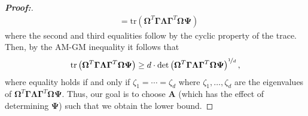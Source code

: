 \documentclass[11pt,twoside]{article}
\theoremstyle{definition}
\theoremstyle{remark}
\begin{document}
\begin{proof}[\textbf{Proof:}]
\begin{align*}
    &= \text{tr}\left(  \mathbf{\Omega}^T \mathbf{\Gamma} \mathbf{\Lambda} \mathbf{\Gamma}^T \mathbf{\Omega} \mathbf{\Psi}   \right)
\end{align*}
where the second and third equalities follow by the cyclic property of the trace. Then, by the AM-GM inequality it follows that
\begin{align*}
    \text{tr}\left(  \mathbf{\Omega}^T \mathbf{\Gamma} \mathbf{\Lambda} \mathbf{\Gamma}^T \mathbf{\Omega} \mathbf{\Psi}   \right) \geq d \cdot \text{det}\left(  \mathbf{\Omega}^T \mathbf{\Gamma} \mathbf{\Lambda} \mathbf{\Gamma}^T \mathbf{\Omega} \mathbf{\Psi}   \right)^{\nicefrac{1}{d}},
\end{align*}
where equality holds if and only if $\zeta_1 = \cdots = \zeta_d$ where $\zeta_1, \ldots, \zeta_d$ are the eigenvalues of $\mathbf{\Omega}^T \mathbf{\Gamma} \mathbf{\Lambda} \mathbf{\Gamma}^T \mathbf{\Omega} \mathbf{\Psi}$. Thus, our goal is to choose $\mathbf{A}$ (which has the effect of determining $\mathbf{\Psi}$) such that we obtain the lower bound.


\end{proof}
\end{document}
